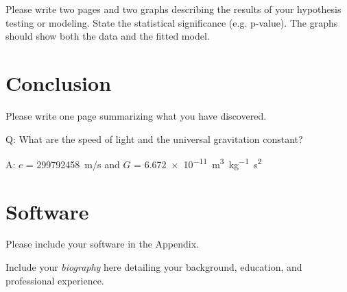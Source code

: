 \documentclass[11pt]{report}
\begin{document}
Please write two pages and two graphs describing the results of your
hypothesis testing or modeling.  State the statistical significance
(e.g. p-value).  The graphs should show both the data and the fitted
model.

\chapter{Conclusion}

Please write one page summarizing what you have discovered.



Q:  What are the speed of light and the universal gravitation constant?

A:  $c$ = \SI{299792458}{m/s} and
    $G$ = \SI{6.672e-11}{m^3kg^{-1}s^2}\cite[pp.~F-244--245]{Weast80}

\appendix
\appendixeqnumbering
%

\chapter{Software}

Please include your software in the Appendix.






\biography

\noindent Include your \emph{biography} here detailing your background,
education, and professional experience.
\end{document}
